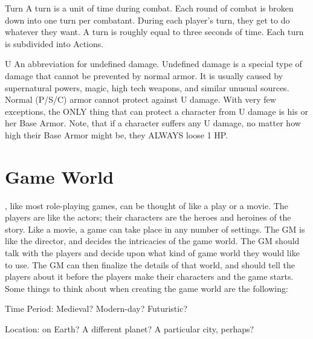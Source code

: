 \documentclass[twoside]{book}
\begin{document}
              
               Turn   
                  A turn is a unit of time during combat. Each
                 round of combat is broken down into one turn per
                 combatant. During each player’s turn, they get to
                 do whatever they want. A turn is roughly equal to three
                 seconds of time. Each turn is subdivided into Actions.
                 
              
              
               U   
                  An abbreviation for undefined damage. Undefined
                 damage is a special type of damage that cannot be
                 prevented by normal armor. It is usually caused by
                 supernatural powers, magic, high tech weapons, and
                 similar unusual sources. Normal (P/S/C) armor cannot
                 protect against U damage. With very few exceptions, the
                 ONLY thing that can protect a character from U damage is
                 his or her Base Armor. Note, that if a character suffers
                 any U damage, no matter how high their Base Armor might
                 be, they ALWAYS loose 1 HP. 
              
          
\section{Game World}
    \APATHY{}, like most role-playing games, can be
            thought of like a play or a movie. The players are like the
            actors; their characters are the heroes and heroines of the
            story. Like a movie, a game can take place in any number of
            settings. The GM is like the director, and decides the
            intricacies of the game world.
           The GM should talk with the players and decide upon
             what kind of game world they would like to use. The GM can
             then finalize the details of that world, and should tell the
             players about it before the players make their characters
             and the game starts.  Some things to think about when creating the game
             world are the following:   
              
                 Time Period: Medieval? Modern-day? Futuristic?
                 
              
              
                  Location: on Earth? A different planet? A
                 particular city, perhaps? 
              
\end{document}
